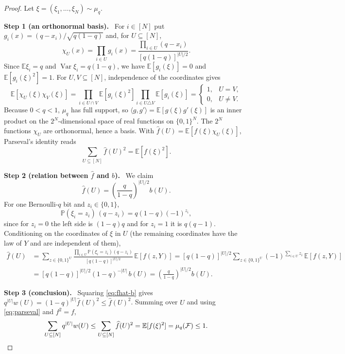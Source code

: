 \documentclass[11pt,letterpaper]{article}
\theoremstyle{definition}
\theoremstyle{remark}
\numberwithin{equation}{section}
\newcommand{\step}[1]{\par\medskip\noindent\textbf{#1}\ }
\begin{document}
\begin{proof}
Let $\xi=(\xi_1,\ldots,\xi_N)\sim\mu_q$.

\step{Step 1 (an orthonormal basis).}
For $i\in[N]$ put $g_i(x)=(q-x_i)/\sqrt{q(1-q)}$ and, for
$U\subseteq[N]$,
\[
 \chi_U(x)=\prod_{i\in U}g_i(x)
 =\frac{\prod_{i\in U}(q-x_i)}{[q(1-q)]^{|U|/2}} .
\]
Since $\mathbb E\xi_i=q$ and $\operatorname{Var}\xi_i=q(1-q)$, we have
$\mathbb E[g_i(\xi)]=0$ and $\mathbb E[g_i(\xi)^2]=1$. For
$U,V\subseteq[N]$, independence of the coordinates gives
\[
\mathbb E[\chi_U(\xi)\chi_V(\xi)]
=\prod_{i\in U\cap V}\mathbb E[g_i(\xi)^2]
 \prod_{i\in U\triangle V}\mathbb E[g_i(\xi)]
=\begin{cases}1,&U=V,\\0,&U\ne V.\end{cases}
\]
Because $0<q<1$, $\mu_q$ has full support, so
$\langle g,g'\rangle=\mathbb E[g(\xi)g'(\xi)]$ is an inner product on the
$2^N$-dimensional space of real functions on $\{0,1\}^N$. The $2^N$
functions $\chi_U$ are orthonormal, hence a basis. With
$\widehat f(U)=\mathbb E[f(\xi)\chi_U(\xi)]$, Parseval's identity reads
\begin{equation}\label{eq:parseval}
\sum_{U\subseteq[N]}\widehat f(U)^2=\mathbb E[f(\xi)^2].
\end{equation}

\step{Step 2 (relation between $\widehat f$ and $b$).}
We claim
\begin{equation}\label{eq:fhat-b}
 \widehat f(U)=\left(\frac{q}{1-q}\right)^{|U|/2}b(U).
\end{equation}
For one Bernoulli-$q$ bit and $z_i\in\{0,1\}$,
\[
 \mathbb P(\xi_i=z_i)\,(q-z_i)=q(1-q)(-1)^{z_i},
\]
since for $z_i=0$ the left side is $(1-q)q$ and for $z_i=1$ it is
$q(q-1)$. Conditioning on the coordinates of $\xi$ in $U$ (the remaining
coordinates have the law of $Y$ and are independent of them),
\begin{align*}
\widehat f(U)
&=\sum_{z\in\{0,1\}^U}
  \frac{\prod_{i\in U}\mathbb P(\xi_i=z_i)(q-z_i)}{[q(1-q)]^{|U|/2}}\,
  \mathbb E[f(z,Y)]
 =[q(1-q)]^{|U|/2}
 \sum_{z\in\{0,1\}^{U}}(-1)^{\sum_{i\in U}z_i}\,\mathbb E[f(z,Y)]\\
&=[q(1-q)]^{|U|/2}(1-q)^{-|U|}\,b(U)
 =\left(\frac{q}{1-q}\right)^{|U|/2}b(U).
\end{align*}

\step{Step 3 (conclusion).}
Squaring \eqref{eq:fhat-b} gives
$q^{|U|}w(U)=(1-q)^{|U|}\widehat f(U)^2\le\widehat f(U)^2$. Summing over
$U$ and using \eqref{eq:parseval} and $f^2=f$,
\[
 \sum_{U\subseteq[N]}q^{|U|}w(U)
 \le\sum_{U\subseteq[N]}\widehat f(U)^2
 =\mathbb E[f(\xi)^2]
 =\mu_q(\mathcal F)\le1. \qedhere
\]
\end{proof}
\end{document}
